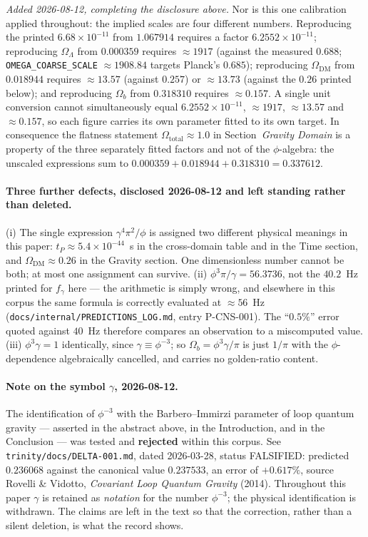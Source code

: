 \documentclass[12pt,a4paper]{article}
\begin{document}
\emph{Added 2026-08-12, completing the disclosure above.} Nor is this one calibration applied throughout: the implied scales are four different numbers. Reproducing the printed $6.68\times10^{-11}$ from $1.067914$ requires a factor $6.2552\times10^{-11}$; reproducing $\Omega_\Lambda$ from $0.000359$ requires ${\approx}1917$ (against the measured $0.688$; \texttt{OMEGA\_COARSE\_SCALE} $\approx 1908.84$ targets Planck's $0.685$); reproducing $\Omega_{\text{DM}}$ from $0.018944$ requires ${\approx}13.57$ (against $0.257$) or ${\approx}13.73$ (against the $0.26$ printed below); and reproducing $\Omega_b$ from $0.318310$ requires ${\approx}0.157$. A single unit conversion cannot simultaneously equal $6.2552\times10^{-11}$, ${\approx}1917$, ${\approx}13.57$ and ${\approx}0.157$, so each figure carries its own parameter fitted to its own target. In consequence the flatness statement $\Omega_{\text{total}} \approx 1.0$ in Section~\emph{Gravity Domain} is a property of the three separately fitted factors and not of the $\phi$-algebra: the unscaled expressions sum to $0.000359 + 0.018944 + 0.318310 = 0.337612$.

\paragraph{Three further defects, disclosed 2026-08-12 and left standing rather than deleted.} (i) The single expression $\gamma^4\pi^2/\phi$ is assigned two different physical meanings in this paper: $t_P \approx 5.4\times10^{-44}$~s in the cross-domain table and in the Time section, and $\Omega_{\text{DM}} \approx 0.26$ in the Gravity section. One dimensionless number cannot be both; at most one assignment can survive. (ii) $\phi^3\pi/\gamma = 56.3736$, not the $40.2$~Hz printed for $f_\gamma$ here --- the arithmetic is simply wrong, and elsewhere in this corpus the same formula is correctly evaluated at ${\approx}56$~Hz (\texttt{docs/internal/PREDICTIONS\_LOG.md}, entry P-CNS-001). The ``$0.5\%$'' error quoted against $40$~Hz therefore compares an observation to a miscomputed value. (iii) $\phi^3\gamma = 1$ identically, since $\gamma \equiv \phi^{-3}$; so $\Omega_b = \phi^3\gamma/\pi$ is just $1/\pi$ with the $\phi$-dependence algebraically cancelled, and carries no golden-ratio content.

\paragraph{Note on the symbol $\gamma$, 2026-08-12.} The identification of $\phi^{-3}$ with the Barbero--Immirzi parameter of loop quantum gravity --- asserted in the abstract above, in the Introduction, and in the Conclusion --- was tested and \textbf{rejected} within this corpus. See \texttt{trinity/docs/DELTA-001.md}, dated 2026-03-28, status FALSIFIED: predicted $0.236068$ against the canonical value $0.237533$, an error of $+0.617\%$, source Rovelli \& Vidotto, \emph{Covariant Loop Quantum Gravity} (2014). Throughout this paper $\gamma$ is retained as \emph{notation} for the number $\phi^{-3}$; the physical identification is withdrawn. The claims are left in the text so that the correction, rather than a silent deletion, is what the record shows.
\end{document}

